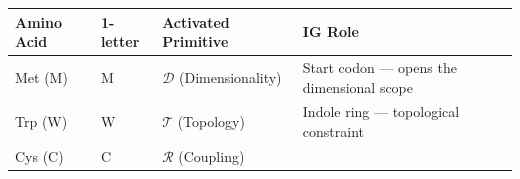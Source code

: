 \begin{longtable}[]{@{}llll@{}}
\toprule
\begin{minipage}[b]{0.20\columnwidth}\raggedright
Amino Acid\strut
\end{minipage} & \begin{minipage}[b]{0.17\columnwidth}\raggedright
1-letter\strut
\end{minipage} & \begin{minipage}[b]{0.36\columnwidth}\raggedright
Activated Primitive\strut
\end{minipage} & \begin{minipage}[b]{0.15\columnwidth}\raggedright
IG Role\strut
\end{minipage}\tabularnewline
\midrule
\endhead
\begin{minipage}[t]{0.20\columnwidth}\raggedright
Met (M)\strut
\end{minipage} & \begin{minipage}[t]{0.17\columnwidth}\raggedright
M\strut
\end{minipage} & \begin{minipage}[t]{0.36\columnwidth}\raggedright
\(\mathcal{D}\) (Dimensionality)\strut
\end{minipage} & \begin{minipage}[t]{0.15\columnwidth}\raggedright
Start codon --- opens the dimensional scope\strut
\end{minipage}\tabularnewline
\begin{minipage}[t]{0.20\columnwidth}\raggedright
Trp (W)\strut
\end{minipage} & \begin{minipage}[t]{0.17\columnwidth}\raggedright
W\strut
\end{minipage} & \begin{minipage}[t]{0.36\columnwidth}\raggedright
\(\mathcal{T}\) (Topology)\strut
\end{minipage} & \begin{minipage}[t]{0.15\columnwidth}\raggedright
Indole ring --- topological constraint\strut
\end{minipage}\tabularnewline
\begin{minipage}[t]{0.20\columnwidth}\raggedright
Cys (C)\strut
\end{minipage} & \begin{minipage}[t]{0.17\columnwidth}\raggedright
C\strut
\end{minipage} & \begin{minipage}[t]{0.36\columnwidth}\raggedright
\(\mathcal{R}\) (Coupling)\strut

\end{minipage}
\end{longtable}
